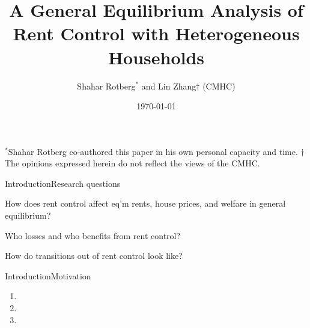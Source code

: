 \documentclass[11pt,aspectratio=169]{beamer}
\title{A General Equilibrium Analysis of Rent Control with Heterogeneous Households}
\date{\today}
\author{Shahar Rotberg$^*$ and Lin Zhang$\dagger$ (CMHC)}
\begin{document}
\begin{frame}
\maketitle
 
 \vspace{1cm}
{\footnotesize $^*$Shahar Rotberg co-authored this paper in his own personal capacity and time. $\dagger$The opinions expressed herein do not reflect the views of the CMHC.}
\end{frame}

\begin{frame}{Introduction}{Research questions}

How does rent control affect eq'm rents, house prices, and welfare in general equilibrium?

\vspace{0.5cm}

Who losses and who benefits from rent control?

\vspace{0.5cm}

How do transitions out of rent control look like?
 
\end{frame}

\begin{frame}{Introduction}{Motivation}

\begin{enumerate}
    \item {}
    \item {}
    \item {}
\end{enumerate}
    
\end{frame}
\end{document}
